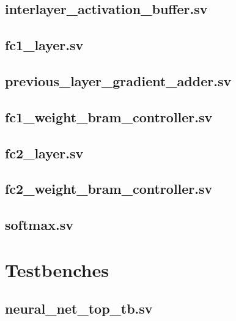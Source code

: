 \subsection{interlayer\_activation\_buffer.sv}

\pagebreak

\subsection{fc1\_layer.sv}

\pagebreak

\subsection{previous\_layer\_gradient\_adder.sv}

\pagebreak

\subsection{fc1\_weight\_bram\_controller.sv}

\pagebreak


\subsection{fc2\_layer.sv}

\pagebreak

\subsection{fc2\_weight\_bram\_controller.sv}

\pagebreak

\subsection{softmax.sv}

\pagebreak

\section{Testbenches}
\subsection{neural\_net\_top\_tb.sv}

\pagebreak

